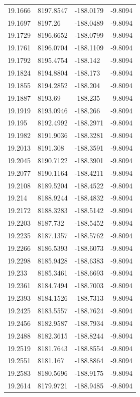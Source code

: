 \begin{table}[H]
\begin{tabular}{llll}
19.1666 & 8197.8547 & -188.0179 & -9.8094 \\
19.1697 & 8197.26 & -188.0489 & -9.8094 \\
19.1729 & 8196.6652 & -188.0799 & -9.8094 \\
19.1761 & 8196.0704 & -188.1109 & -9.8094 \\
19.1792 & 8195.4754 & -188.142 & -9.8094 \\
19.1824 & 8194.8804 & -188.173 & -9.8094 \\
19.1855 & 8194.2852 & -188.204 & -9.8094 \\
19.1887 & 8193.69 & -188.235 & -9.8094 \\
19.1919 & 8193.0946 & -188.266 & -9.8094 \\
19.195 & 8192.4992 & -188.2971 & -9.8094 \\
19.1982 & 8191.9036 & -188.3281 & -9.8094 \\
19.2013 & 8191.308 & -188.3591 & -9.8094 \\
19.2045 & 8190.7122 & -188.3901 & -9.8094 \\
19.2077 & 8190.1164 & -188.4211 & -9.8094 \\
19.2108 & 8189.5204 & -188.4522 & -9.8094 \\
19.214 & 8188.9244 & -188.4832 & -9.8094 \\
19.2172 & 8188.3283 & -188.5142 & -9.8094 \\
19.2203 & 8187.732 & -188.5452 & -9.8094 \\
19.2235 & 8187.1357 & -188.5762 & -9.8094 \\
19.2266 & 8186.5393 & -188.6073 & -9.8094 \\
19.2298 & 8185.9428 & -188.6383 & -9.8094 \\
19.233 & 8185.3461 & -188.6693 & -9.8094 \\
19.2361 & 8184.7494 & -188.7003 & -9.8094 \\
19.2393 & 8184.1526 & -188.7313 & -9.8094 \\
19.2425 & 8183.5557 & -188.7624 & -9.8094 \\
19.2456 & 8182.9587 & -188.7934 & -9.8094 \\
19.2488 & 8182.3615 & -188.8244 & -9.8094 \\
19.2519 & 8181.7643 & -188.8554 & -9.8094 \\
19.2551 & 8181.167 & -188.8864 & -9.8094 \\
19.2583 & 8180.5696 & -188.9175 & -9.8094 \\
19.2614 & 8179.9721 & -188.9485 & -9.8094 \\

\end{tabular}
\end{table}

